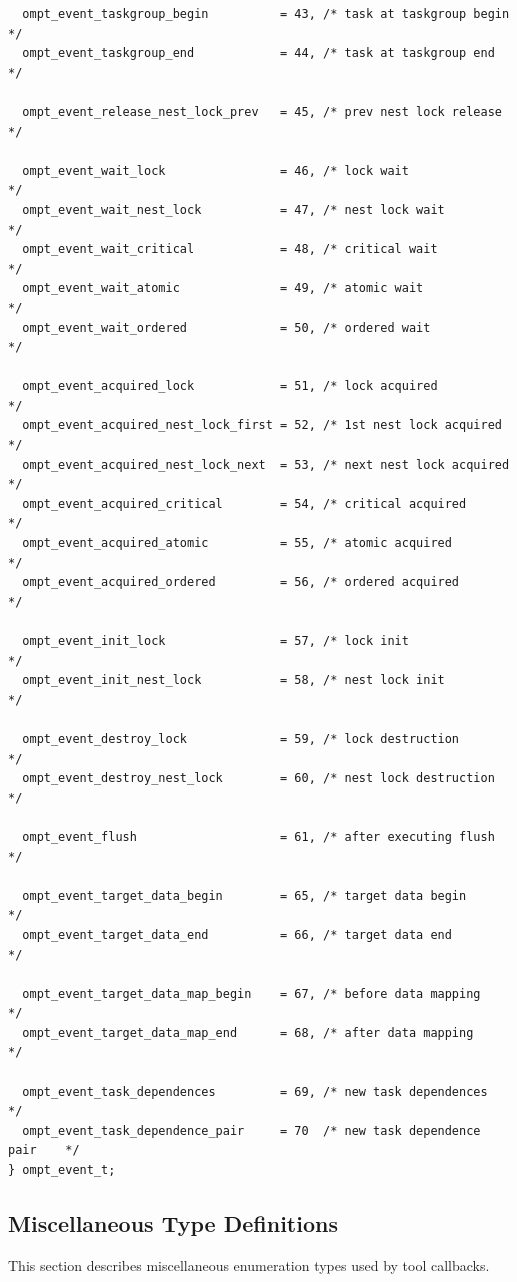 \documentclass{article}
\begin{document}
{\begin{verbatim}
  ompt_event_taskgroup_begin          = 43, /* task at taskgroup begin    */
  ompt_event_taskgroup_end            = 44, /* task at taskgroup end      */

  ompt_event_release_nest_lock_prev   = 45, /* prev nest lock release     */
								    
  ompt_event_wait_lock                = 46, /* lock wait                  */
  ompt_event_wait_nest_lock           = 47, /* nest lock wait             */
  ompt_event_wait_critical            = 48, /* critical wait              */
  ompt_event_wait_atomic              = 49, /* atomic wait                */
  ompt_event_wait_ordered             = 50, /* ordered wait               */
		 	            				    	    
  ompt_event_acquired_lock            = 51, /* lock acquired              */
  ompt_event_acquired_nest_lock_first = 52, /* 1st nest lock acquired     */
  ompt_event_acquired_nest_lock_next  = 53, /* next nest lock acquired    */
  ompt_event_acquired_critical        = 54, /* critical acquired          */
  ompt_event_acquired_atomic          = 55, /* atomic acquired            */
  ompt_event_acquired_ordered         = 56, /* ordered acquired           */
			            				    	    
  ompt_event_init_lock                = 57, /* lock init                  */
  ompt_event_init_nest_lock           = 58, /* nest lock init             */
  
  ompt_event_destroy_lock             = 59, /* lock destruction           */
  ompt_event_destroy_nest_lock        = 60, /* nest lock destruction      */
			            	 			         
  ompt_event_flush                    = 61, /* after executing flush      */ 

  ompt_event_target_data_begin        = 65, /* target data begin          */
  ompt_event_target_data_end          = 66, /* target data end            */

  ompt_event_target_data_map_begin    = 67, /* before data mapping        */
  ompt_event_target_data_map_end      = 68, /* after data mapping         */
  
  ompt_event_task_dependences         = 69, /* new task dependences        */
  ompt_event_task_dependence_pair     = 70  /* new task dependence pair    */
} ompt_event_t;
\end{verbatim}

\clearpage  
\subsection{Miscellaneous Type Definitions}
\label{appendix:ompt-types:misc}
This section describes miscellaneous enumeration types used by tool callbacks.

}
\end{document}
